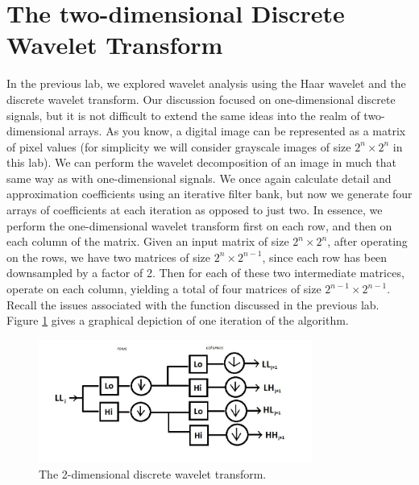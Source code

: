 

\section*{The two-dimensional Discrete Wavelet Transform}
In the previous lab, we explored wavelet analysis using the Haar wavelet and
the discrete wavelet transform. Our discussion focused on one-dimensional
discrete signals, but it is not difficult to extend the same ideas into the
realm of two-dimensional arrays. As you know, a digital image can be represented
as a matrix of pixel values (for simplicity we will consider grayscale images of
size $2^n \times 2^n$ in this lab). We can perform the wavelet decomposition of
an image in much that same way as with one-dimensional signals. We once again
calculate detail and approximation coefficients using an iterative filter
bank, but now we generate four arrays of coefficients at each iteration as opposed to
just two. In essence, we perform the one-dimensional wavelet transform first on each
row, and then on each column of the matrix. Given an input matrix of size $2^n \times
2^n$, after operating on the rows, we have two matrices of size $2^n \times 2^{n-1}$,
since each row has been downsampled by a factor of 2. Then for each of these two
intermediate matrices, operate on each column, yielding a total of four matrices of
size $2^{n-1} \times 2^{n-1}$. Recall the issues associated with the function
 discussed in the previous lab. Figure \ref{fig:2dwt}
gives a graphical depiction of one iteration of the algorithm.

\begin{figure}[t]
    \includegraphics[width=0.8\textwidth]{2dwt.jpg}
    \caption{The 2-dimensional discrete wavelet transform.}
    \label{fig:2dwt}
\end{figure}


